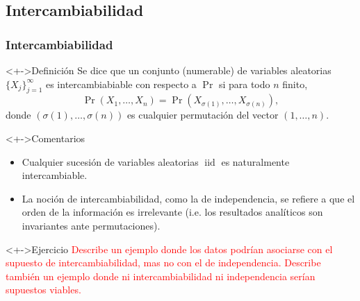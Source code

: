 \documentclass[cjk,t,compress]{beamer}
\newcommand{\iid}{\operatorname{\text{iid}}}
\begin{document}
	\subsection{Intercambiabilidad}
	\frame
	{
    \frametitle{Intercambiabilidad}
  		{\scriptsize  	
		
		\begin{block}<+->{Definici\'on}
	  	{
	  	Se dice que un conjunto (numerable) de variables  aleatorias $\{X_j\}_{j=1}^{\infty}$ es intercambiabiable con respecto a $\Pr$ si para todo $n$ finito,
	  	\begin{equation}
	  		\Pr(X_1,\ldots,X_n)=\Pr(X_{\sigma(1)},\ldots,X_{\sigma(n)}),
	  	\end{equation}
	  	donde $(\sigma(1),\ldots,\sigma(n))$ es cualquier permutaci\'on del vector $(1,\ldots,n)$.
	  	}
 		\end{block}  		

	  	\vspace{0.3cm}
		\begin{block}<+->{Comentarios}
	  	{
	  	\begin{itemize}
	  		\item Cualquier sucesi\'on de variables aleatorias $\iid$ es naturalmente intercambiable.
	  		\item La noci\'on de intercambiabilidad, como la de independencia, se refiere a que el orden de la informaci\'on es irrelevante (i.e. los resultados anal\'iticos son
invariantes ante permutaciones).
	  	\end{itemize}
	  	}
 		\end{block}  		

	  	\vspace{0.3cm}
		\begin{block}<+->{Ejercicio}
	  	{
	  	\textcolor{red}{Describe un ejemplo donde los datos podr\'ian asociarse con el supuesto de
intercambiabilidad, mas no con el de independencia. Describe tambi\'en un ejemplo donde ni 
intercambiabilidad ni independencia ser\'ian supuestos viables.}
	  	}
 		\end{block}  		
		}
	}
\end{document}
